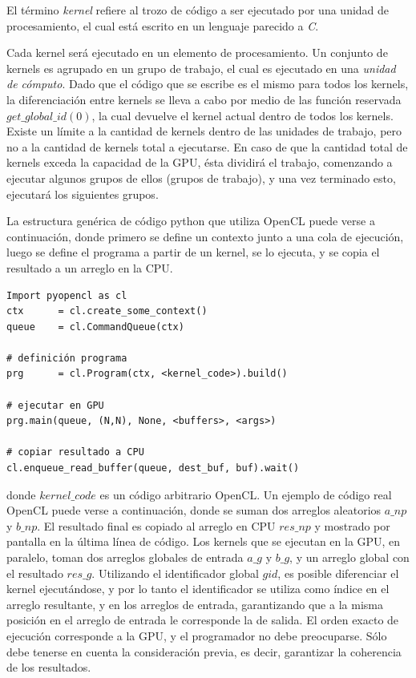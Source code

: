 El término {\em kernel} refiere al trozo de código a ser ejecutado por una unidad de procesamiento, el cual está escrito en un lenguaje parecido a {\em C}.

Cada kernel será ejecutado en un elemento de procesamiento.
Un conjunto de kernels es agrupado en un grupo de trabajo, el cual es ejecutado en una {\em unidad de cómputo}.
Dado que el código que se escribe es el mismo para todos los kernels, la diferenciación entre kernels se lleva a cabo por medio de las función reservada $get\_global\_id(0)$, la cual devuelve el kernel actual dentro de todos los kernels.
Existe un límite a la cantidad de kernels dentro de las unidades de trabajo, pero no a la cantidad de kernels total a ejecutarse.
En caso de que la cantidad total de kernels exceda la capacidad de la GPU, ésta dividirá el trabajo, comenzando a ejecutar algunos grupos de ellos (grupos de trabajo), y una vez terminado esto, ejecutará los siguientes grupos.


La estructura genérica de código python que utiliza OpenCL puede verse a continuación,
donde primero se define un contexto junto a una cola de ejecución, luego se define el programa a partir de un kernel, se lo ejecuta, y se copia el resultado a un arreglo en la CPU.

\begin{verbatim}
Import pyopencl as cl
ctx      = cl.create_some_context()
queue    = cl.CommandQueue(ctx)

# definición programa
prg      = cl.Program(ctx, <kernel_code>).build()

# ejecutar en GPU
prg.main(queue, (N,N), None, <buffers>, <args>) 

# copiar resultado a CPU
cl.enqueue_read_buffer(queue, dest_buf, buf).wait()
\end{verbatim}

donde $kernel\_code$ es un código arbitrario OpenCL.
Un ejemplo de código real OpenCL puede verse a continuación, donde se suman dos arreglos aleatorios $a\_{np}$ y $b\_{np}$. El resultado final es copiado al arreglo en CPU $res\_np$ y mostrado por pantalla en la última línea de código.
Los kernels que se ejecutan en la GPU, en paralelo, toman dos arreglos globales de entrada $a\_g$ y $b\_g$, y un arreglo global con el resultado $res\_g$.
Utilizando el identificador global $gid$, es posible diferenciar el kernel ejecutándose, y por lo tanto el identificador se utiliza como índice en el arreglo resultante, y en los arreglos de entrada, garantizando que a la misma posición en el arreglo de entrada le corresponde la de salida.
El orden exacto de ejecución corresponde a la GPU, y el programador no debe preocuparse.
Sólo debe tenerse en cuenta la consideración previa, es decir, garantizar la coherencia de los resultados.

